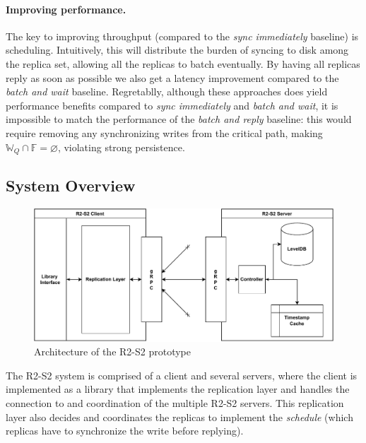 \paragraph{Improving performance.}The key to improving throughput
(compared to the \emph{sync immediately} baseline) is scheduling. Intuitively,
this will distribute the burden of syncing to disk among the
replica set, allowing all the replicas to batch eventually. By
having all replicas reply as soon as possible we also get a
latency improvement compared to the \emph{batch and wait}
baseline. Regretablly, although
these approaches does yield performance benefits compared to
\emph{sync immediately} and \emph{batch and wait}, it is impossible to match the performance of
the \emph{batch and reply} baseline: this would require removing any synchronizing writes from the
critical path, making $\mathbb{W}_Q \cap \mathbb{F} =
\varnothing$, violating strong persistence.

\subsection{System Overview}\label{ssec:r2s2overview}

\begin{figure}[t]
    \centering
    \includegraphics[width=\linewidth]{img/r2s2_arch}
    \caption{Architecture of the \ac{R2-S2}
    prototype}\label{fig:r2s2arch}
\end{figure}

The \ac{R2-S2} system is comprised of a client and several
servers, where the client is implemented as a library that
implements the replication layer and handles the connection to
and coordination of the multiple \ac{R2-S2} servers. This
replication layer also decides and coordinates the replicas to
implement the \emph{schedule} (which replicas have to synchronize
the write before replying).

